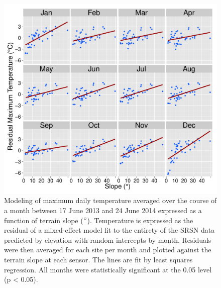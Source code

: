 \documentclass{ametsoc}
\begin{document}
\begin{figure}[ht]

\centerline{\includegraphics[width=39pc]{figure06_slope-elev-resid.pdf}}

\caption{Modeling of maximum daily temperature averaged over the course of a month between 17 June 2013 and 24 June 2014 expressed as a function of terrain slope ($\degree$). Temperature is expressed as the residual of a mixed-effect model fit to the entirety of the SRSN data predicted by elevation with random intercepts by month. Residuals were then averaged for each site per month and plotted against the terrain slope at each sensor. The lines are fit by least squares regression. All months were statistically significant at the 0.05 level (p < 0.05).\label{fig:6}}

\end{figure}
\end{document}
